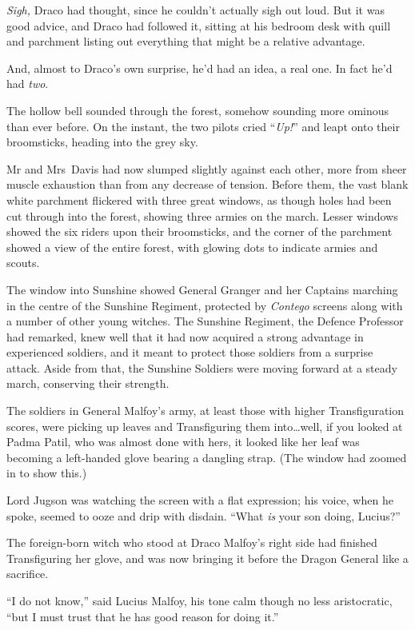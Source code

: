 \emph{Sigh,} Draco had thought, since he couldn’t actually sigh out loud. But it was good advice, and Draco had followed it, sitting at his bedroom desk with quill and parchment listing out everything that might be a relative advantage.

And, almost to Draco’s own surprise, he’d had an idea, a real one. In fact he’d had \emph{two}.

The hollow bell sounded through the forest, somehow sounding more ominous than ever before. On the instant, the two pilots cried “\emph{Up!}” and leapt onto their broomsticks, heading into the grey sky.

\later

Mr and Mrs~Davis had now slumped slightly against each other, more from sheer muscle exhaustion than from any decrease of tension. Before them, the vast blank white parchment flickered with three great windows, as though holes had been cut through into the forest, showing three armies on the march. Lesser windows showed the six riders upon their broomsticks, and the corner of the parchment showed a view of the entire forest, with glowing dots to indicate armies and scouts.

The window into Sunshine showed General Granger and her Captains marching in the centre of the Sunshine Regiment, protected by \emph{Contego} screens along with a number of other young witches. The Sunshine Regiment, the Defence Professor had remarked, knew well that it had now acquired a strong advantage in experienced soldiers, and it meant to protect those soldiers from a surprise attack. Aside from that, the Sunshine Soldiers were moving forward at a steady march, conserving their strength.

The soldiers in General Malfoy’s army, at least those with higher Transfiguration scores, were picking up leaves and Transfiguring them into…well, if you looked at Padma Patil, who was almost done with hers, it looked like her leaf was becoming a left-handed glove bearing a dangling strap. (The window had zoomed in to show this.)

Lord Jugson was watching the screen with a flat expression; his voice, when he spoke, seemed to ooze and drip with disdain. “What \emph{is} your son doing, Lucius?”

The foreign-born witch who stood at Draco Malfoy’s right side had finished Transfiguring her glove, and was now bringing it before the Dragon General like a sacrifice.

“I do not know,” said Lucius Malfoy, his tone calm though no less aristocratic, “but I must trust that he has good reason for doing it.”

